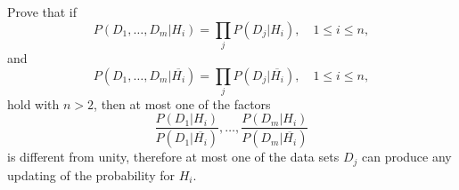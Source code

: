 \documentclass{note}
\begin{document}
\begin{exercise}{4.1}
Prove that if
\begin{equation}
P(D_1, \dots, D_m | H_i) = \prod_j P(D_j | H_i), \quad 1 \le i \le n,
\end{equation}
and
\begin{equation}
P(D_1, \dots, D_m | \overline{H_i}) = \prod_j P(D_j | \overline{H_i}), \quad 1 \le i \le n,
\end{equation}
hold with $n > 2$, then at most one of the factors
\begin{equation}
\frac{P(D_1 | H_i)}{P(D_1 | \overline{H_i})}, \dots, \frac{P(D_m | H_i)}{P(D_m | \overline{H_i})}
\end{equation}
is different from unity, therefore at most one of the data sets $D_j$ can produce any updating of the probability for $H_i$.
\end{exercise}
\end{document}
